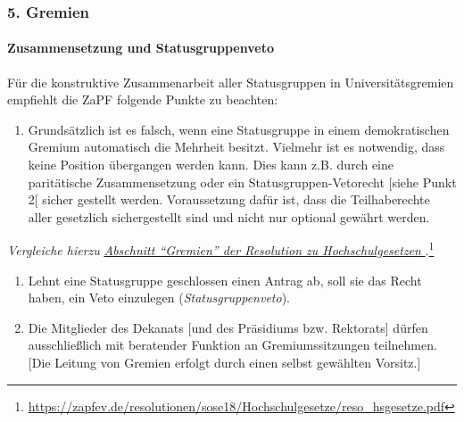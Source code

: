 \documentclass[DIV=calc]{scrartcl}
\begin{document}
\pagebreak
\hypertarget{gremien}{%
\subsubsection*{5. Gremien}\label{gremien}}

\hypertarget{zusammensetzung-und-statusgruppenveto}{%
\paragraph{Zusammensetzung und Statusgruppenveto}\label{zusammensetzung-und-statusgruppenveto}}


Für die konstruktive Zusammenarbeit aller Statusgruppen in Universitätsgremien empfiehlt die ZaPF folgende Punkte zu beachten:

\begin{enumerate}
\def\labelenumi{\arabic{enumi})}
\item Grundsätzlich ist es falsch, wenn eine Statusgruppe in einem demokratischen Gremium automatisch die Mehrheit besitzt. Vielmehr ist es notwendig, dass keine Position übergangen werden kann. Dies kann z.B. durch eine paritätische Zusammensetzung oder ein Statusgruppen-Vetorecht {[}siehe Punkt 2{[} sicher gestellt werden. Voraussetzung dafür ist, dass die Teilhaberechte aller gesetzlich sichergestellt sind und nicht nur optional gewährt werden.
\end{enumerate}

\emph{Vergleiche hierzu }\href{https://zapfev.de/resolutionen/sose18/Hochschulgesetze/reso_hsgesetze.pdf}{\emph{Abschnitt \enquote{Gremien} der Resolution zu Hochschulgesetzen%
  }}.\footnote{\url{https://zapfev.de/resolutionen/sose18/Hochschulgesetze/reso_hsgesetze.pdf}}

\begin{enumerate}
\def\labelenumi{\arabic{enumi})}
\setcounter{enumi}{1}
\item Lehnt eine Statusgruppe geschlossen einen Antrag ab, soll sie das Recht haben, ein Veto einzulegen (\emph{Statusgruppenveto}). %

\item Die Mitglieder des Dekanats {[}und des Präsidiums bzw. Rektorats{]} dürfen ausschließlich mit beratender Funktion an Gremiumssitzungen teilnehmen. {[}Die Leitung von Gremien erfolgt durch einen selbst gewählten Vorsitz.{]}
\end{enumerate}
\end{document}
